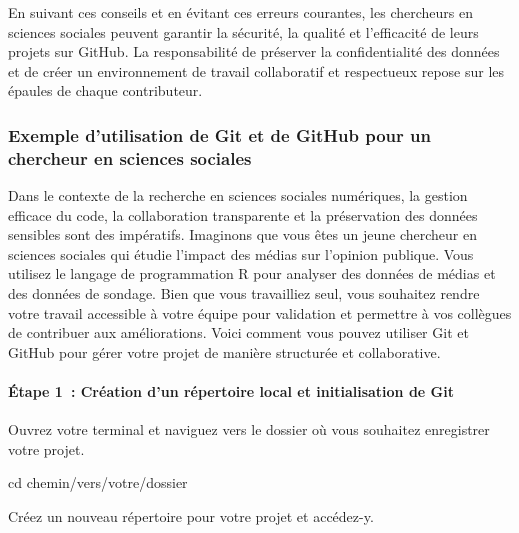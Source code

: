 \documentclass[
  letterpaper,
]{scrbook}
\let\oldparagraph\paragraph
\renewcommand{\paragraph}[1]{\oldparagraph{#1}\mbox{}}
\newenvironment{Shaded}{\begin{snugshade}}{\end{snugshade}}
\newcommand{\BuiltInTok}[1]{\textcolor[rgb]{0.00,0.23,0.31}{#1}}
\newcommand{\NormalTok}[1]{\textcolor[rgb]{0.00,0.23,0.31}{#1}}
\begin{document}
En suivant ces conseils et en évitant ces erreurs courantes, les
chercheurs en sciences sociales peuvent garantir la sécurité, la qualité
et l'efficacité de leurs projets sur GitHub. La responsabilité de
préserver la confidentialité des données et de créer un environnement de
travail collaboratif et respectueux repose sur les épaules de chaque
contributeur.

\hypertarget{exemple-dutilisation-de-git-et-de-github-pour-un-chercheur-en-sciences-sociales}{%
\subsubsection{Exemple d'utilisation de Git et de GitHub pour un
chercheur en sciences
sociales}\label{exemple-dutilisation-de-git-et-de-github-pour-un-chercheur-en-sciences-sociales}}

Dans le contexte de la recherche en sciences sociales numériques, la
gestion efficace du code, la collaboration transparente et la
préservation des données sensibles sont des impératifs. Imaginons que
vous êtes un jeune chercheur en sciences sociales qui étudie l'impact
des médias sur l'opinion publique. Vous utilisez le langage de
programmation R pour analyser des données de médias et des données de
sondage. Bien que vous travailliez seul, vous souhaitez rendre votre
travail accessible à votre équipe pour validation et permettre à vos
collègues de contribuer aux améliorations. Voici comment vous pouvez
utiliser Git et GitHub pour gérer votre projet de manière structurée et
collaborative.

\hypertarget{uxe9tape-1-cruxe9ation-dun-ruxe9pertoire-local-et-initialisation-de-git}{%
\paragraph{Étape 1~: Création d'un répertoire local et initialisation de
Git}\label{uxe9tape-1-cruxe9ation-dun-ruxe9pertoire-local-et-initialisation-de-git}}

Ouvrez votre terminal et naviguez vers le dossier où vous souhaitez
enregistrer votre projet.

\begin{Shaded}
\begin{Highlighting}[]
\BuiltInTok{cd}\NormalTok{ chemin/vers/votre/dossier}
\end{Highlighting}
\end{Shaded}

Créez un nouveau répertoire pour votre projet et accédez-y.
\end{document}
